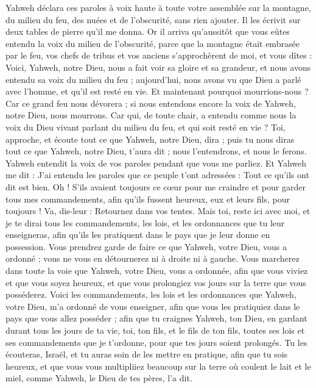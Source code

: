 \begin{multicols}{2}
Yahweh déclara ces paroles à voix haute à toute votre assemblée sur la montagne, du milieu du feu, des nuées et de l'obscurité, sans rien ajouter. Il les écrivit sur deux tables de pierre qu'il me donna.
Or il arriva qu'aussitôt que vous eûtes entendu la voix du milieu de l'obscurité, parce que la montagne était embrasée par le feu, vos chefs de tribus et vos anciens s'approchèrent de moi,
et vous dîtes : Voici, Yahweh, notre Dieu, nous a fait voir sa gloire et sa grandeur, et nous avons entendu sa voix du milieu du feu ; aujourd'hui, nous avons vu que Dieu a parlé avec l'homme, et qu'il est resté en vie.
Et maintenant pourquoi mourrions-nous ? Car ce grand feu nous dévorera ; si nous entendons encore la voix de Yahweh, notre Dieu, nous mourrons.
Car qui, de toute chair, a entendu comme nous la voix du Dieu vivant parlant du milieu du feu, et qui soit resté en vie ?
Toi, approche, et écoute tout ce que Yahweh, notre Dieu, dira ; puis tu nous diras tout ce que Yahweh, notre Dieu, t'aura dit ; nous l'entendrons, et nous le ferons.
Yahweh entendit la voix de vos paroles pendant que vous me parliez. Et Yahweh me dit : J'ai entendu les paroles que ce peuple t'ont adressées : Tout ce qu'ils ont dit est bien.
Oh ! S'ils avaient toujours ce cœur pour me craindre et pour garder tous mes commandements, afin qu'ils fussent heureux, eux et leurs fils, pour toujours !
Va, dis-leur : Retournez dans vos tentes.
Mais toi, reste ici avec moi, et je te dirai tous les commandements, les lois, et les ordonnances que tu leur enseigneras, afin qu'ils les pratiquent dans le pays que je leur donne en possession.
Vous prendrez garde de faire ce que Yahweh, votre Dieu, vous a ordonné ; vous ne vous en détournerez ni à droite ni à gauche.
Vous marcherez dans toute la voie que Yahweh, votre Dieu, vous a ordonnée, afin que vous viviez et que vous soyez heureux, et que vous prolongiez vos jours sur la terre que vous posséderez.
\VerseOne{}Voici les commandements, les lois et les ordonnances que Yahweh, votre Dieu, m'a ordonné de vous enseigner, afin que vous les pratiquiez dans le pays que vous allez posséder ;
afin que tu craignes Yahweh, ton Dieu, en gardant durant tous les jours de ta vie, toi, ton fils, et le fils de ton fils, toutes ses lois et ses commandements que je t'ordonne, pour que tes jours soient prolongés.
Tu les écouteras, Israël, et tu auras soin de les mettre en pratique, afin que tu sois heureux, et que vous vous multipliiez beaucoup sur la terre où coulent le lait et le miel, comme Yahweh, le Dieu de tes pères, l'a dit.

\end{multicols}
